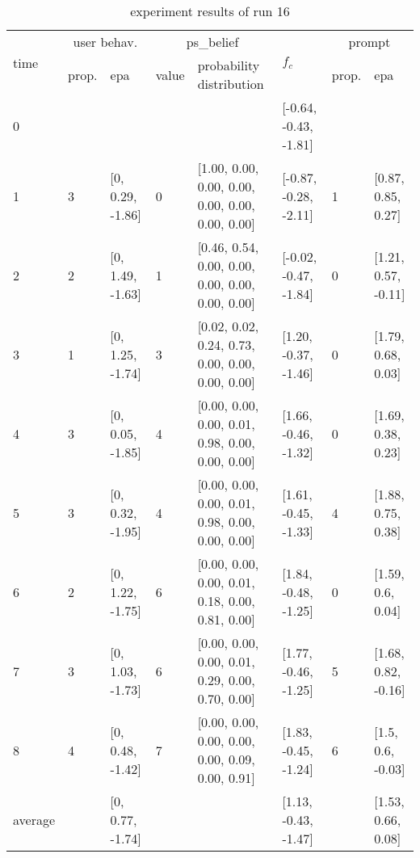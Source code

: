 \begin{table}[htbp]\footnotesize
\caption{experiment results of run 16}
\begin{center}
\begin{tabular}{|p{0.4cm}|p{0.6cm}|l|p{0.6cm}|p{3.3cm}|l|p{0.6cm}|l|}
\hline

\multirow{2}{*}{time} & \multicolumn{2}{c|}{user behav.} & \multicolumn{2}{c|}{ps\_belief} &
\multirow{2}{*}{$f_c$} & \multicolumn{2}{c|}{prompt} \\ \cline{2-5}\cline{ 7- 8}
& prop. & epa & value & probability distribution &  & prop. & epa \\ \hline

0 & \multicolumn{1}{l|}{} &  & \multicolumn{1}{l|}{} &  & [-0.64, -0.43, -1.81] & \multicolumn{1}{l|}{} &  \\ \hline
1 & 3 & [0, 0.29, -1.86] & 0 & [1.00, 0.00, 0.00, 0.00, 0.00, 0.00, 0.00, 0.00] & [-0.87, -0.28, -2.11] & 1 & [0.87, 0.85, 0.27] \\ \hline
2 & 2 & [0, 1.49, -1.63] & 1 & [0.46, 0.54, 0.00, 0.00, 0.00, 0.00, 0.00, 0.00] & [-0.02, -0.47, -1.84] & 0 & [1.21, 0.57, -0.11] \\ \hline
3 & 1 & [0, 1.25, -1.74] & 3 & [0.02, 0.02, 0.24, 0.73, 0.00, 0.00, 0.00, 0.00] & [1.20, -0.37, -1.46] & 0 & [1.79, 0.68, 0.03] \\ \hline
4 & 3 & [0, 0.05, -1.85] & 4 & [0.00, 0.00, 0.00, 0.01, 0.98, 0.00, 0.00, 0.00] & [1.66, -0.46, -1.32] & 0 & [1.69, 0.38, 0.23] \\ \hline
5 & 3 & [0, 0.32, -1.95] & 4 & [0.00, 0.00, 0.00, 0.01, 0.98, 0.00, 0.00, 0.00] & [1.61, -0.45, -1.33] & 4 & [1.88, 0.75, 0.38] \\ \hline
6 & 2 & [0, 1.22, -1.75] & 6 & [0.00, 0.00, 0.00, 0.01, 0.18, 0.00, 0.81, 0.00] & [1.84, -0.48, -1.25] & 0 & [1.59, 0.6, 0.04] \\ \hline
7 & 3 & [0, 1.03, -1.73] & 6 & [0.00, 0.00, 0.00, 0.01, 0.29, 0.00, 0.70, 0.00] & [1.77, -0.46, -1.25] & 5 & [1.68, 0.82, -0.16] \\ \hline
8 & 4 & [0, 0.48, -1.42] & 7 & [0.00, 0.00, 0.00, 0.00, 0.00, 0.09, 0.00, 0.91] & [1.83, -0.45, -1.24] & 6 & [1.5, 0.6, -0.03] \\ \hline
\multicolumn{1}{|l|}{average} & \multicolumn{1}{l|}{} & [0, 0.77, -1.74] & \multicolumn{1}{l|}{} &  & [1.13, -0.43, -1.47] & \multicolumn{1}{l|}{} & [1.53, 0.66, 0.08] \\ \hline
\end{tabular}
\end{center}
\label{}
\end{table}


